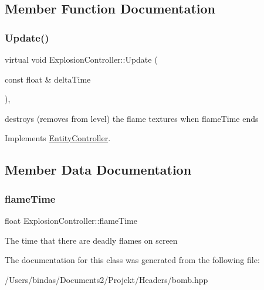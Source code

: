 \subsection{Member Function Documentation}
\mbox{\label{class_explosion_controller_ad67c33a4c9fc0f23c84266cb382500f1}} 
\subsubsection{\texorpdfstring{Update()}{Update()}}
{\footnotesize\ttfamily virtual void Explosion\+Controller\+::\+Update (\begin{DoxyParamCaption}\item[{const float \&}]{delta\+Time }\end{DoxyParamCaption})\hspace{0.3cm}{\ttfamily [override]}, {\ttfamily [virtual]}}

destroys (removes from level) the flame textures when flame\+Time ends 

Implements \mbox{\hyperlink{class_entity_controller_ab7f285a1c788ab04b9f0c0260dc8c523}{Entity\+Controller}}.



\subsection{Member Data Documentation}
\mbox{\label{class_explosion_controller_ac29b93a5277e3f486a02af139690fcbf}} 
\subsubsection{\texorpdfstring{flameTime}{flameTime}}
{\footnotesize\ttfamily float Explosion\+Controller\+::flame\+Time\hspace{0.3cm}{\ttfamily [private]}}

The time that there are deadly flames on screen 

The documentation for this class was generated from the following file\+:\begin{DoxyCompactItemize}
\item 
/\+Users/bindas/\+Documents2/\+Projekt/\+Headers/bomb.\+hpp\end{DoxyCompactItemize}
